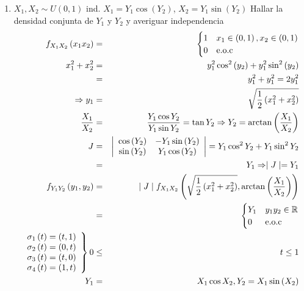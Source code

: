 \begin{enumerate}
\item $X_{1}, X_{2} \sim U \left(0,1 \right)$ ind. $X_{1}= Y_{1} \cos \left(Y_{2} \right)$, $X_{2} = Y_{1} \sin \left(Y_{2} \right)$ Hallar la densidad conjunta de $Y_{1} $ y $Y_{2}$ y averiguar independencia
\begin{eqnarray*}
f_{X_{1}X_{2}} \left(x_{1} x_{2} \right) &=&  
\begin{cases}
1 & x_{1} \in  \left(0,1 \right), x_{2} \in \left(0,1 \right)\\
0 & \textrm{e.o.c}
\end{cases}\\
x_{1}^2+ x_{2}^2 &=& y_{1}^2 \cos^2 \left(y_{2} \right) + y_{1}^2 \sin ^2 \left(y_{2} \right)\\
&=& y_{1}^2 + y_{1}^2 = 2 y_{1}^2\\
\Rightarrow y_{1} &=& \sqrt{\frac{1}{2} \left( x_{1}^2 + x_{2}^2 \right) }\\
\frac{X_{1}}{X_{2}} &=& \frac{Y_{1} \cos Y_{2}}{Y_{1} \sin Y_{2}} = \tan Y_{2} \Rightarrow Y_{2}= \arctan \left( \frac{X_{1}}{X_{2}} \right)\\
J &=& \left| \begin{array}{cc}
\cos \left( Y_{2} \right) & -Y_{1} \sin \left( Y_{2} \right) \\
\sin \left( Y_{2} \right) & Y_{1} \cos \left( Y_{2} \right)
\end{array} \right| = Y_{1} \cos^2 Y_{2} + Y_{1} \sin^2 Y_{2}\\
&=& Y_{1} \Rightarrow \mid J \mid = Y_{1}\\
f_{Y_{1}Y_{2}} \left( y_{1}, y_{2} \right) &=& \mid J \mid f_{X_{1}X_{2}} \left( \sqrt{ \frac{1}{2} \left(x_{1}^2 + x_{2}^2 \right)}, \arctan  \left( \frac{X_{1}}{X_{2}} \right) \right)\\
&=& \begin{cases}
Y_{1} & y_{1}y_{2}\in \rea\\
0 & \textrm{e.o.c}
\end{cases}\\
\left.
\begin{array}{cccc}
\sigma_{1} \left( t \right) = \left(t,1 \right)\\
\sigma_{2} \left( t \right) = \left(0,t \right)\\
\sigma_{3} \left( t \right) = \left(t,0 \right)\\
\sigma_{4} \left( t \right) = \left(1,t \right)
\end{array}
\right\} 0 &\leq& t \leq 1\\
Y_{1} &=& X_{1} \cos X_{2}, Y_{2} = X_{1} \sin \left( X_{2} \right)\\

\end{eqnarray*}
\end{enumerate}
